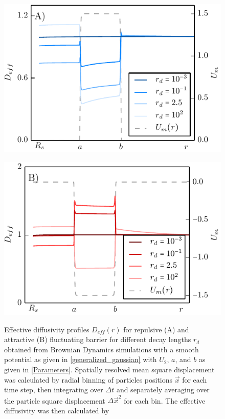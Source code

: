 \begin{minipage}[t]{.5 \textwidth}
    \begin{figure}[H]
        \includegraphics[width = 1 \textwidth]{plots/repulsive_mapping_d.pdf}
    \end{figure}
\end{minipage}\begin{minipage}[t]{.5 \textwidth}
    \begin{figure}[H]
        \includegraphics[width = 1 \textwidth]{plots/attractive_mapping_d.pdf}
    \end{figure}
\end{minipage}

\begin{minipage}[t]{1 \textwidth}
    \begin{figure}[H]
        \caption{Effective diffusivity profiles $D_{eff}(r)$ for repulsive (A) and attractive (B) fluctuating barrier for different decay lengths $r_d$ obtained from Brownian Dynamics simulations with a smooth potential as given in \eqref{generalized_gaussian} with $U_2$, $a$, and $b$ as given in \eqref{Parameters}. Spatially resolved mean square displacement was calculated by radial binning of particles positions $\vec{x}$ for each time step, then integrating over $\Delta t$ and separately averaging over the particle square displacement $\Delta \vec{x}^{2}$ for each bin. The effective diffusivity was then calculated by \label{Deff_numeric} \label{DeffBD}}
    \end{figure}
\end{minipage}
